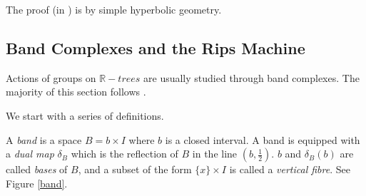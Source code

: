 The proof (in \cite{Bestvina2}) is by simple hyperbolic geometry.



    

\subsection{Band Complexes and the Rips Machine}
Actions of groups on $\mathbb{R}-trees$ are usually studied through band complexes. The majority of this section follows \cite{Wilton}.

We start with a series of definitions.
\begin{definition}
    A \emph{band} is a space $B=b\times I$ where $b$ is a closed interval. A band is equipped with a \emph{dual map} $\delta_B$ which is the reflection of $B$ in the line $(b,\frac{1}{2})$. $b$ and $\delta_B(b)$ are called \emph{bases} of $B$, and a subset of the form $\{x\}\times I$ is called a \emph{vertical fibre}. See Figure \ref{band}.
\end{definition}


